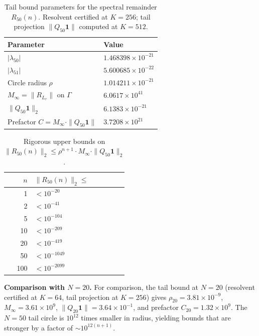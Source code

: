 \documentclass[11pt]{article}
\begin{document}
\begin{table}[ht]
\centering
\caption{Tail bound parameters for the spectral remainder $R_{50}(n)$.
Resolvent certified at $K = 256$; tail projection $\|Q_{50}\mathbf{1}\|$ computed at $K=512$.}
\label{tab:tail-bound}
\begin{tabular}{ll}
\toprule
Parameter & Value \\
\midrule
$|\lambda_{50}|$ & $1.468398 \times 10^{-21}$ \\
$|\lambda_{51}|$ & $5.600685 \times 10^{-22}$ \\
Circle radius $\rho$ & $1.014211 \times 10^{-21}$ \\
$M_\infty = \|R_{L_r}\|$ on $\Gamma$ & $6.0617 \times 10^{41}$ \\
$\|Q_{50} \mathbf{1}\|_2$ & $6.1383 \times 10^{-21}$ \\
Prefactor $C = M_\infty \cdot \|Q_{50}\mathbf{1}\|$ & $3.7208 \times 10^{21}$ \\
\bottomrule
\end{tabular}
\end{table}

\begin{table}[ht]
\centering
\caption{Rigorous upper bounds on $\|R_{50}(n)\|_2 \leq \rho^{n+1} \cdot M_\infty \cdot \|Q_{50}\mathbf{1}\|_2$.}
\label{tab:tail-bounds-sample}
\begin{tabular}{rl}
\toprule
$n$ & $\|R_{50}(n)\|_2 \leq$ \\
\midrule
1 & $< 10^{-20}$ \\
2 & $< 10^{-41}$ \\
5 & $< 10^{-104}$ \\
10 & $< 10^{-209}$ \\
20 & $< 10^{-419}$ \\
50 & $< 10^{-1049}$ \\
100 & $< 10^{-2099}$ \\
\bottomrule
\end{tabular}
\end{table}

\medskip\noindent
\textbf{Comparison with $N = 20$.}
For comparison, the tail bound at $N = 20$ (resolvent certified at $K = 64$,
tail projection at $K = 256$) gives $\rho_{20} = 3.81 \times 10^{-9}$,
$M_\infty = 3.61 \times 10^{9}$, $\|Q_{20}\mathbf{1}\| = 3.64 \times 10^{-1}$,
and prefactor $C_{20} = 1.32 \times 10^{9}$.
The $N = 50$ tail circle is $10^{12}$ times smaller in radius,
yielding bounds that are stronger by a factor of $\sim 10^{12(n+1)}$.
\end{document}
